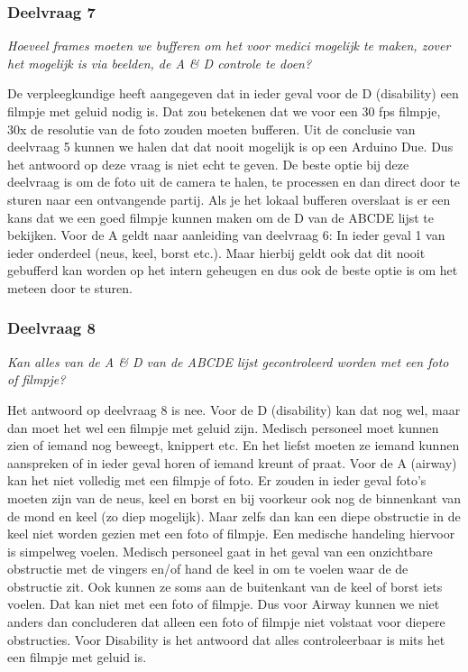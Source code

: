 \documentclass{article}
\begin{document}
\subsubsection{Deelvraag 7}
\textit{Hoeveel frames moeten we bufferen om het voor medici mogelijk te maken, zover het mogelijk is via beelden, de A \& D controle te doen? }

De verpleegkundige heeft aangegeven dat in ieder geval voor de D (disability) een filmpje met geluid nodig is. Dat zou betekenen dat we voor een 30 fps filmpje, 30x de resolutie van de foto zouden moeten bufferen. Uit de conclusie van deelvraag 5 kunnen we halen dat dat nooit mogelijk is op een Arduino Due. Dus het antwoord op deze vraag is niet echt te geven. 
De beste optie bij deze deelvraag is om de foto uit de camera te halen, te processen en dan direct door te sturen naar een ontvangende partij. Als je het lokaal bufferen overslaat is er een kans dat we een goed filmpje kunnen maken om de D van de ABCDE lijst te bekijken. 
Voor de A geldt naar aanleiding van deelvraag 6: In ieder geval 1 van ieder onderdeel (neus, keel, borst etc.). Maar hierbij geldt ook dat dit nooit gebufferd kan worden op het intern geheugen en dus ook de beste optie is om het meteen door te sturen.

\subsubsection{Deelvraag 8}
\textit{Kan alles van de A & D van de ABCDE lijst gecontroleerd worden met een foto of filmpje? }

Het antwoord op deelvraag 8 is nee. Voor de D (disability) kan dat nog wel, maar dan moet het wel een filmpje met geluid zijn. Medisch personeel moet kunnen zien of iemand nog beweegt, knippert etc. En het liefst moeten ze iemand kunnen aanspreken of in ieder geval horen of iemand kreunt of praat. 
Voor de A (airway) kan het niet volledig met een filmpje of foto. Er zouden in ieder geval foto’s moeten zijn van de neus, keel en borst en bij voorkeur ook nog de binnenkant van de mond en keel (zo diep mogelijk). Maar zelfs dan kan een diepe obstructie in de keel niet worden gezien met een foto of filmpje. Een medische handeling hiervoor is simpelweg voelen. Medisch personeel gaat in het geval van een onzichtbare obstructie met de vingers en/of hand de keel in om te voelen waar de de obstructie zit. Ook kunnen ze soms aan de buitenkant van de keel of borst iets voelen. Dat kan niet met een foto of filmpje. Dus voor Airway kunnen we niet anders dan concluderen dat alleen een foto of filmpje niet volstaat voor diepere obstructies. Voor Disability is het antwoord dat alles controleerbaar is mits het een filmpje met geluid is.
\end{document}
